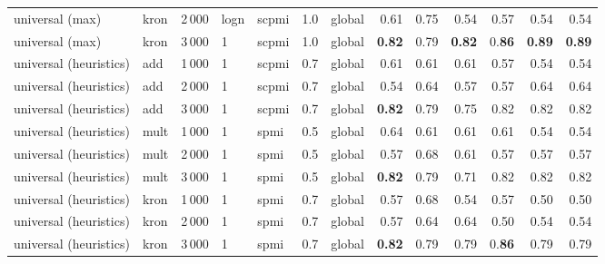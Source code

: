 \begin{tabular}{lllllllrrrrrr}
universal (max)        & kron & 2\,000 & logn & scpmi & 1.0 & global &         0.61 &          0.75 &           0.54 &            0.57 &             0.54 &        0.54 \\
universal (max)        & kron & 3\,000 & 1    & scpmi & 1.0 & global &         \textbf{0.82} &          0.79 &           \textbf{0.82} &            0.\textbf{86} &             \textbf{0.89} &        \textbf{0.89} \\ \addlinespace
universal (heuristics) & add  & 1\,000 & 1    & scpmi & 0.7 & global &         0.61 &          0.61 &           0.61 &            0.57 &             0.54 &        0.54 \\
universal (heuristics) & add  & 2\,000 & 1    & scpmi & 0.7 & global &         0.54 &          0.64 &           0.57 &            0.57 &             0.64 &        0.64 \\
universal (heuristics) & add  & 3\,000 & 1    & scpmi & 0.7 & global &         \textbf{0.82} &          0.79 &           0.75 &            0.82 &             0.82 &        0.82 \\ \addlinespace
universal (heuristics) & mult & 1\,000 & 1    & spmi  & 0.5 & global &         0.64 &          0.61 &           0.61 &            0.61 &             0.54 &        0.54 \\
universal (heuristics) & mult & 2\,000 & 1    & spmi  & 0.5 & global &         0.57 &          0.68 &           0.61 &            0.57 &             0.57 &        0.57 \\
universal (heuristics) & mult & 3\,000 & 1    & spmi  & 0.5 & global &         \textbf{0.82} &          0.79 &           0.71 &            0.82 &             0.82 &        0.82 \\ \addlinespace
universal (heuristics) & kron & 1\,000 & 1    & spmi  & 0.7 & global &         0.57 &          0.68 &           0.54 &            0.57 &             0.50 &        0.50 \\
universal (heuristics) & kron & 2\,000 & 1    & spmi  & 0.7 & global &         0.57 &          0.64 &           0.64 &            0.50 &             0.54 &        0.54 \\
universal (heuristics) & kron & 3\,000 & 1    & spmi  & 0.7 & global &         \textbf{0.82} &          0.79 &           0.79 &            0.\textbf{86} &             0.79 &        0.79 \\
\bottomrule
\end{tabular}
